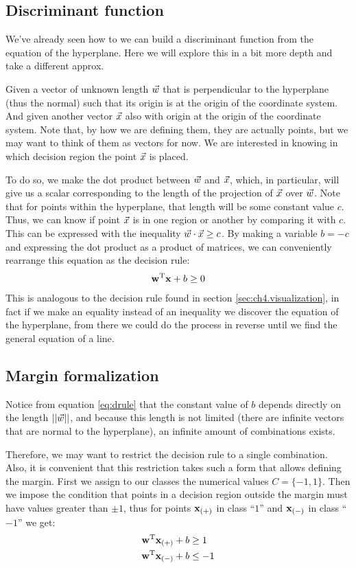 \subsection{Discriminant function}

We've already seen how to we can build a discriminant function from the equation of the hyperplane. Here we will explore this in a bit more depth and take a different approx. 

Given a vector of unknown length $\vec{w}$ that is perpendicular to the hyperplane (thus the normal) such that its origin is at the origin of the coordinate system. And given another vector $\vec{x}$ also with origin at the origin of the coordinate system. Note that, by how we are defining them, they are actually points, but we may want to think of them as vectors for now. We are interested in knowing in which decision region the point $\vec{x}$ is placed.

To do so, we make the dot product between $\vec{w}$ and $\vec{x}$, which, in particular, will give us a scalar corresponding to the length of the projection of $\vec{x}$ over $\vec{w}$. Note that for points within the hyperplane, that length will be some constant value $c$. Thus, we can know if point $\vec{x}$ is in one region or another by comparing it with $c$. This can be expressed with the inequality $\vec{w} \cdot \vec{x} \ge c$. By making a variable $b = -c$ and expressing the dot product as a product of matrices, we can conveniently rearrange this equation as the decision rule:
\begin{align}\label{eq:drule}
    \mathbf{w}^{\text{T}} \mathbf{x} + b \ge 0
\end{align}
This is analogous to the decision rule found in section \ref{sec:ch4.visualization}, in fact if we make an equality instead of an inequality we discover the equation of the hyperplane, from there we could do the process in reverse until we find the general equation of a line. 

\subsection{Margin formalization}

Notice from equation \ref{eq:drule} that the constant value of $b$ depends directly on the length $||\vec{w}||$, and because this length is not limited (there are infinite vectors that are normal to the hyperplane), an infinite amount of combinations exists.

Therefore, we may want to restrict the decision rule to a single combination. Also, it is convenient that this restriction takes such a form that allows defining the margin. First we assign to our classes the numerical values $C = \{-1, 1\}$. Then we impose the condition that points in a decision region outside the margin must have values greater than $\pm 1$, thus for points $\mathbf{x}_{(+)}$ in class “$1$” and $\mathbf{x}_{(-)}$ in class “$-1$” we get:
\begin{align*}
    \mathbf{w}^{\text{T}} \mathbf{x}_{(+)} + b &\ge 1\\
    \mathbf{w}^{\text{T}} \mathbf{x}_{(-)} + b &\le -1
\end{align*}

